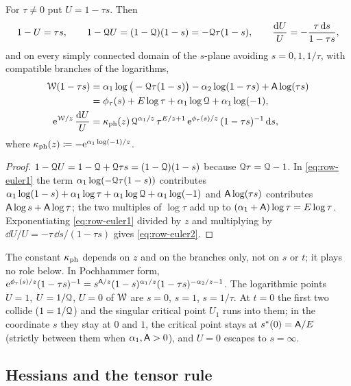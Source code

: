 \begin{lem}
\label{lem:row-euler}
For $\tau\neq0$ put $U=1-\tau s$. Then
\[
1-U=\tau s,\qquad 1-\mathcal{Q} U=(1-\mathcal{Q})(1-s)=-\mathcal{Q}\tau(1-s),\qquad \frac{\mathrm{d} U}{U}=-\frac{\tau\,\mathrm{d} s}{1-\tau s},
\]
and on every simply connected domain of the $s$-plane avoiding $s=0,1,1/\tau$, with compatible branches of the logarithms,
\begin{align}
\label{eq:row-euler1}
\mathcal{W}(1-\tau s)&=\alpha_1\log\big(-\mathcal{Q}\tau(1-s)\big)-\alpha_2\log(1-\tau s)+\mathsf{A}\log(\tau s)\notag\\
&=\phi_\tau(s)+E\log\tau+\alpha_1\log\mathcal{Q}+\alpha_1\log(-1),\\
\label{eq:row-euler2}
\mathrm{e}^{\mathcal{W}/z}\,\frac{\mathrm{d} U}{U}&=\kappa_{\mathrm{ph}}(z)\,\mathcal{Q}^{\alpha_1/z}\,\tau^{E/z+1}\,\mathrm{e}^{\phi_\tau(s)/z}\,(1-\tau s)^{-1}\,\mathrm{d} s,
\end{align}
where $\kappa_{\mathrm{ph}}(z)\coloneqq-\mathrm{e}^{\alpha_1\log(-1)/z}$.
\end{lem}

\begin{proof}
$1-\mathcal{Q} U=1-\mathcal{Q}+\mathcal{Q}\tau s=(1-\mathcal{Q})(1-s)$ because $\mathcal{Q}\tau=\mathcal{Q}-1$. In \eqref{eq:row-euler1} the term $\alpha_1\log(-\mathcal{Q}\tau(1-s))$ contributes $\alpha_1\log(1-s)+\alpha_1\log\tau+\alpha_1\log\mathcal{Q}+\alpha_1\log(-1)$ and $\mathsf{A}\log(\tau s)$ contributes $\mathsf{A}\log s+\mathsf{A}\log\tau$; the two multiples of $\log\tau$ add up to $(\alpha_1+\mathsf{A})\log\tau=E\log\tau$. Exponentiating \eqref{eq:row-euler1} divided by $z$ and multiplying by $\dd U/U=-\tau\,\dd s/(1-\tau s)$ gives \eqref{eq:row-euler2}.
\end{proof}

The constant $\kappa_{\mathrm{ph}}$ depends on $z$ and on the branches only, not on $s$ or $t$; it plays no role below. In Pochhammer form, $\mathrm{e}^{\phi_\tau(s)/z}(1-\tau s)^{-1}=s^{\mathsf{A}/z}(1-s)^{\alpha_1/z}(1-\tau s)^{-\alpha_2/z-1}$. The logarithmic points $U=1$, $U=1/\mathcal{Q}$, $U=0$ of $\mathcal{W}$ are $s=0$, $s=1$, $s=1/\tau$. At $t=0$ the first two collide ($1=1/\mathcal{Q}$) and the singular critical point $U_1$ runs into them; in the coordinate $s$ they stay at $0$ and $1$, the critical point stays at $s^{\ast}(0)=\mathsf{A}/E$ (strictly between them when $\alpha_1,\mathsf{A}>0$), and $U=0$ escapes to $s=\infty$.

\subsection{Hessians and the tensor rule}
\label{sec:row-hess}

